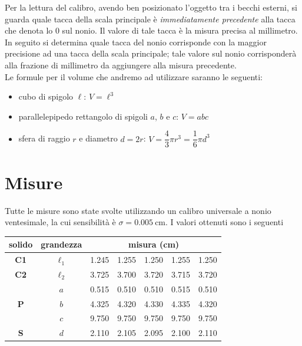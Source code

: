 \documentclass[12pt]{scrartcl}
\begin{document}
Per la lettura del calibro, avendo ben posizionato l'oggetto tra i becchi esterni,
si guarda quale tacca della scala principale è \emph{immediatamente precedente} alla
tacca che denota lo \(0\) sul nonio. Il valore di tale tacca è la misura precisa al
millimetro. In seguito si determina quale tacca del nonio corrisponde con la maggior
precisione ad una tacca della scala principale; tale valore sul nonio corrisponderà
alla frazione di millimetro da aggiungere alla misura precedente.\\[1em]
Le formule per il volume che andremo ad utilizzare saranno le seguenti:

\begin{itemize}
  \item cubo di spigolo \(\ell\):\hspace{5mm} \(V = \ell^3\)
  \item parallelepipedo rettangolo di spigoli \(a\), \(b\) e \(c\):\hspace{5mm} \(V = abc\)
  \item sfera di raggio \(r\) e diametro \(d = 2r\):\hspace{5mm} \(V = \dfrac{4}{3} \pi r^3 = \dfrac{1}{6} \pi d^3\)
\end{itemize}


\section{Misure}

Tutte le misure sono state svolte utilizzando un calibro universale a nonio ventesimale,
la cui sensibilità è \(\sigma = \SI{0.005}{\centi\metre}\). I valori ottenuti sono i seguenti

\begin{center}\begin{tabular}{ccccccc}
  \toprule
  \textbf{solido} & \textbf{grandezza} & \multicolumn{5}{c}{\textbf{misura} (\si{\centi\metre})} \\
  \midrule
  \textbf{C1} & \(\ell_1\) & \num{1.245} & \num{1.255} & \num{1.250} & \num{1.255} & \num{1.250} \\
  \midrule
  \textbf{C2} & \(\ell_2\) & \num{3.725} & \num{3.700} & \num{3.720} & \num{3.715} & \num{3.720} \\
  \midrule
  \multirow{3}{*}{\textbf{P}} & \(a\) & \num{0.515} & \num{0.510} & \num{0.510} & \num{0.515} & \num{0.510} \\
                              & \(b\) & \num{4.325} & \num{4.320} & \num{4.330} & \num{4.335} & \num{4.320} \\
                              & \(c\) & \num{9.750} & \num{9.750} & \num{9.750} & \num{9.750} & \num{9.750} \\
  \midrule
  \textbf{S} & \(d\) & \num{2.110} & \num{2.105} & \num{2.095} & \num{2.100} & \num{2.110} \\
  \bottomrule
\end{tabular}\end{center}
\end{document}
